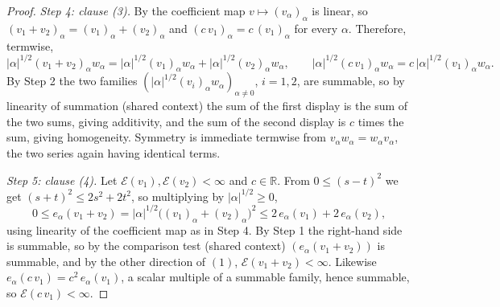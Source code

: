 \begin{proof}
\emph{Step 4: clause (3).}
By  the coefficient map $v \mapsto (v_\alpha)_\alpha$ is
linear, so $(v_1+v_2)_\alpha = (v_1)_\alpha + (v_2)_\alpha$ and
$(c\,v_1)_\alpha = c\,(v_1)_\alpha$ for every $\alpha$.  Therefore, termwise,
\[
  |\alpha|^{1/2}(v_1+v_2)_\alpha w_\alpha
    = |\alpha|^{1/2}(v_1)_\alpha w_\alpha + |\alpha|^{1/2}(v_2)_\alpha w_\alpha ,
  \qquad
  |\alpha|^{1/2}(c\,v_1)_\alpha w_\alpha
    = c\,|\alpha|^{1/2}(v_1)_\alpha w_\alpha .
\]
By Step 2 the two families $(|\alpha|^{1/2}(v_i)_\alpha w_\alpha)_{\alpha\neq0}$,
$i = 1,2$, are summable, so by linearity of summation (shared context) the sum of
the first display is the sum of the two sums, giving additivity, and the sum of
the second display is $c$ times the sum, giving homogeneity.  Symmetry is
immediate termwise from $v_\alpha w_\alpha = w_\alpha v_\alpha$, the two series
again having identical terms.

\emph{Step 5: clause (4).}
Let $\mathcal{E}(v_1), \mathcal{E}(v_2) < \infty$ and $c \in \mathbb{R}$.  From
$0 \leq (s-t)^2$ we get $(s+t)^2 \leq 2s^2 + 2t^2$, so multiplying by
$|\alpha|^{1/2} \geq 0$,
\[
  0 \leq e_\alpha(v_1+v_2)
    = |\alpha|^{1/2}\bigl((v_1)_\alpha + (v_2)_\alpha\bigr)^2
    \leq 2\,e_\alpha(v_1) + 2\,e_\alpha(v_2),
\]
using linearity of the coefficient map as in Step 4.  By Step 1 the right-hand
side is summable, so by the comparison test (shared context)
$(e_\alpha(v_1+v_2))$ is summable, and by the other direction of $(1)$,
$\mathcal{E}(v_1+v_2) < \infty$.  Likewise
$e_\alpha(c\,v_1) = c^2\,e_\alpha(v_1)$, a scalar multiple of a summable family,
hence summable, so $\mathcal{E}(c\,v_1) < \infty$.
\end{proof}
